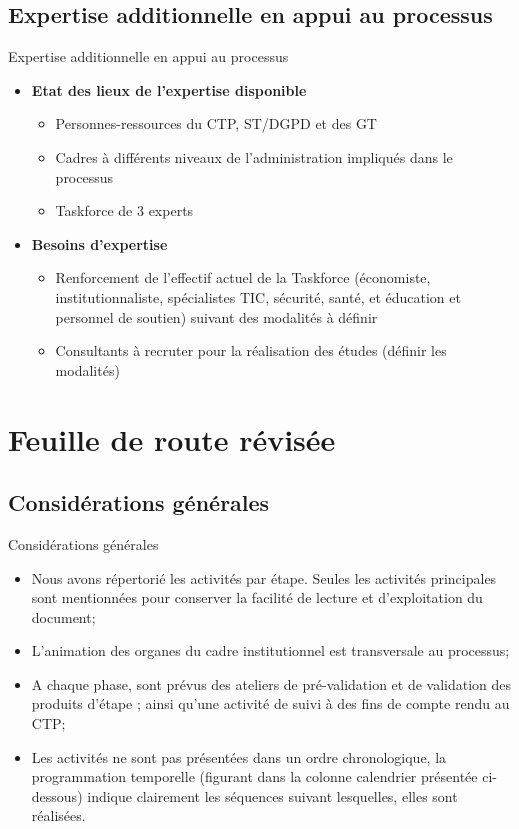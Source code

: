 \documentclass[11pt]{beamer}
\begin{document}
\subsection{\tiny Expertise additionnelle en appui au processus}
\begin{frame}{Expertise additionnelle en appui au processus}
\begin{itemize} [<+->]
 \item  \textbf {Etat des lieux de l’expertise disponible}  \vfill
    \begin{itemize} [<+->]
   \item Personnes-ressources du CTP, ST/DGPD et des GT \vfill
   \item Cadres à différents niveaux de l’administration impliqués dans le processus \vfill
   \item  Taskforce de 3 experts \vfill
    \end{itemize}
 \item \textbf {Besoins d’expertise}  \vfill
    \begin{itemize} [<+->]
    \item Renforcement de l’effectif actuel de la Taskforce (économiste, institutionnaliste, spécialistes TIC, sécurité, santé, et éducation et personnel de soutien) suivant des modalités à définir   \vfill
    \item Consultants à recruter pour la réalisation des études (définir les modalités) \vfill
    \end{itemize}
\end{itemize}
\end{frame}

\section{Feuille de route révisée}
\subsection{\tiny Considérations générales}
\begin{frame}{Considérations générales}
  \begin{itemize} [<+->]
  \item Nous avons répertorié les activités par étape. Seules les activités principales sont mentionnées pour conserver la facilité de lecture et d’exploitation du document; \vfill
 \item  L’animation des organes du cadre institutionnel  est  transversale au processus;  \vfill
 \item  A chaque phase, sont prévus des ateliers de pré-validation et de validation des produits d’étape ;  ainsi qu’une activité de suivi à des fins de compte rendu au CTP;  \vfill
 \item  Les activités ne sont pas présentées dans un ordre chronologique, la programmation temporelle (figurant dans la colonne calendrier  présentée ci-dessous) indique clairement les séquences suivant lesquelles, elles sont réalisées.  \vfill
 \end{itemize}
\end{frame}
\end{document}
